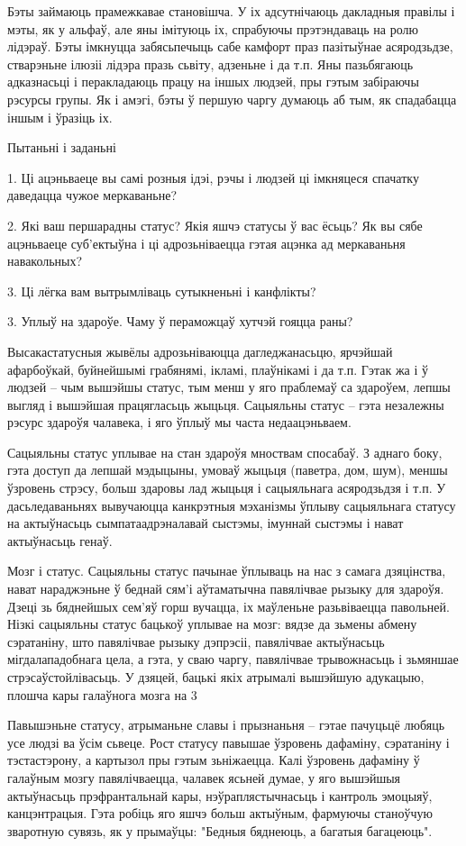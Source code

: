 Бэты займаюць прамежкавае становішча. У іх адсутнічаюць дакладныя правілы і мэты, як у альфаў, але яны імітуюць іх, спрабуючы прэтэндаваць на ролю лідэраў. Бэты імкнуцца забясьпечыць сабе камфорт праз пазітыўнае асяродзьдзе, стварэньне ілюзіі лідэра празь сьвіту, адзеньне і да т.п. Яны пазьбягаюць адказнасьці і перакладаюць працу на іншых людзей, пры гэтым забіраючы рэсурсы групы. Як і амэгі, бэты ў першую чаргу думаюць аб тым, як спадабацца іншым і ўразіць іх.

Пытаньні і заданьні

1. Ці ацэньваеце вы самі розныя ідэі, рэчы і людзей ці імкняцеся спачатку даведацца чужое меркаваньне?

2. Які ваш першарадны статус? Якія яшчэ статусы ў вас ёсьць? Як вы сябе ацэньваеце суб'ектыўна і ці адрозьніваецца гэтая ацэнка ад меркаваньня навакольных?

3. Ці лёгка вам вытрымліваць сутыкненьні і канфлікты?


3. Уплыў на здароўе. Чаму ў пераможцаў хутчэй гояцца раны?

Высакастатусныя жывёлы адрозьніваюцца дагледжанасьцю, ярчэйшай афарбоўкай, буйнейшымі грабянямі, ікламі, плаўнікамі і да т.п. Гэтак жа і ў людзей – чым вышэйшы статус, тым менш у яго праблемаў са здароўем, лепшы выгляд і вышэйшая працягласьць жыцьця. Сацыяльны статус – гэта незалежны рэсурс здароўя чалавека, і яго ўплыў мы часта недаацэньваем. 

Сацыяльны статус уплывае на стан здароўя мноствам спосабаў. З аднаго боку, гэта доступ да лепшай мэдыцыны, умоваў жыцьця (паветра, дом, шум), меншы ўзровень стрэсу, больш здаровы лад жыцьця і сацыяльнага асяродзьдзя і т.п. У дасьледаваньнях вывучаюцца канкрэтныя мэханізмы ўплыву сацыяльнага статусу на актыўнасьць сымпатаадрэналавай сыстэмы, імуннай сыстэмы і нават актыўнасьць генаў.

Мозг і статус. Сацыяльны статус пачынае ўплываць на нас з самага дзяцінства, нават нараджэньне ў беднай сям'і аўтаматычна павялічвае рызыку для здароўя. Дзеці зь бяднейшых сем'яў горш вучацца, іх маўленьне разьвіваецца павольней. Нізкі сацыяльны статус бацькоў уплывае на мозг: вядзе да зьмены абмену сэратаніну, што павялічвае рызыку дэпрэсіі, павялічвае актыўнасьць мігдалападобнага цела, а гэта, у сваю чаргу, павялічвае трывожнасьць і зьмяншае стрэсаўстойлівасьць. У дзяцей, бацькі якіх атрымалі вышэйшую адукацыю, плошча кары галаўнога мозга на 3%

Павышэньне статусу, атрыманьне славы і прызнаньня – гэтае пачуцьцё любяць усе людзі ва ўсім сьвеце. Рост статусу павышае ўзровень дафаміну, сэратаніну і тэстастэрону, а картызол пры гэтым зьніжаецца. Калі ўзровень дафаміну ў галаўным мозгу павялічваецца, чалавек ясьней думае, у яго вышэйшыя актыўнасьць прэфрантальнай кары, нэўраплястычнасьць і кантроль эмоцыяў, канцэнтрацыя. Гэта робіць яго яшчэ больш актыўным, фармуючы станоўчую зваротную сувязь, як у прымаўцы: "Бедныя бяднеюць, а багатыя багацеюць".

